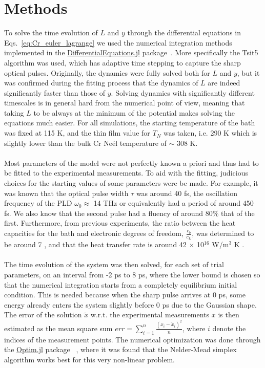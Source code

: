 \section{Methods}
To solve the time evolution of $L$ and $y$ through the differential equations in Eqs.~\ref{eq:Cr_euler_lagrange} we used the numerical integration methods implemented in the \href{https://github.com/SciML/DifferentialEquations.jl}{DifferentialEquations.jl} package~\cite{rackauckas2017differentialequations}. More specifically the Tsit5 algorithm was used, which has adaptive time stepping to capture the sharp optical pulses.
Originally, the dynamics were fully solved both for $L$ and $y$, but it was confirmed during the fitting process that the dynamics of $L$ are indeed significantly faster than those of $y$.
Solving dynamics with significantly different timescales is in general hard from the numerical point of view, meaning that taking $L$ to be always at the minimum of the potential makes solving the equations much easier.
For all simulations, the starting temperature of the bath was fixed at 115 K, and the thin film value for $T_N$ was taken, i.e. 290 K which is slightly lower than the bulk Cr Ne\'el temperature of $\sim$ 308 K.
\\\\
Most parameters of the model were not perfectly known a priori and thus had to be fitted to the experimental measurements.
To aid with the fitting, judicious choices for the starting values of some parameters were be made.
For example, it was known that the optical pulse width $\tau$ was around 40 fs, the oscillation frequency of the PLD $\omega_0 \approx$ 14 THz or equivalently had a period of around 450 fs.
We also know that the second pulse had a fluency of around 80\% that of the first.
Furthermore, from previous experiments, the ratio between the heat capacities for the bath and electronic degrees of freedom, $\frac{c_b}{c_L}$, was determined to be around 7 \cite{Nicholson2016}, and that the heat transfer rate is around 42 $\times$ 10$^{16}$ W/m$^3$ K \cite{Hostetler1999}.
\\\\
The time evolution of the system was then solved, for each set of trial parameters, on an interval from -2 ps to 8 ps, where the lower bound is chosen so that the numerical integration starts from a completely equilibrium initial condition.
This is needed because when the sharp pulse arrives at 0 ps, some energy already enters the system slightly before 0 ps due to the Gaussian shape.
The error of the solution $\tilde{x}$ w.r.t. the experimental measurements $x$ is then estimated as the mean square sum $err = \sum_{i=1}^n \frac{(x_i - \tilde{x}_i)^2}{n}$, where $i$ denote the indices of the measurement points.
The numerical optimization was done through the \href{https://github.com/JuliaNLSolvers/Optim.jl}{Optim.jl} package ~\cite{mogensen2018optim}, where it was found that the Nelder-Mead simplex algorithm \cite{Nelder1965} works best for this very non-linear problem.

